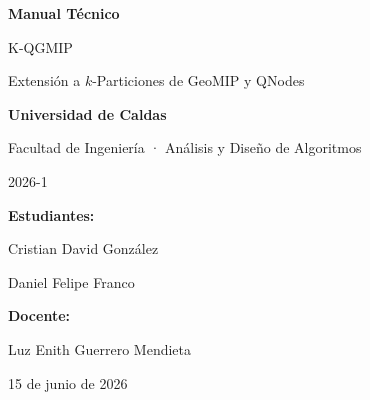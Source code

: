 \documentclass[12pt,letterpaper]{article}
\begin{document}
\begin{titlepage}
  \centering
  \vspace*{2cm}

  {\Huge\bfseries Manual Técnico \par}
  \vspace{0.6cm}
  {\LARGE K-QGMIP \par}
  \vspace{0.3cm}
  {\large Extensión a $k$-Particiones de GeoMIP y QNodes \par}

  \vspace{3cm}

  {\Large\bfseries Universidad de Caldas \par}
  \vspace{0.4cm}
  {\large Facultad de Ingeniería · Análisis y Diseño de Algoritmos \par}
  {\large 2026-1 \par}

  \vspace{4cm}

  {\large\textbf{Estudiantes:} \par}
  \vspace{0.3em}
  {\large Cristian David González \par}
  {\large Daniel Felipe Franco \par}
  \vspace{1.2em}
  {\large\textbf{Docente:} \par}
  \vspace{0.3em}
  {\large Luz Enith Guerrero Mendieta \par}

  \vfill

  {\large 15 de junio de 2026 \par}
\end{titlepage}

\tableofcontents
\clearpage
\listoffigures
\clearpage
\listofalgorithms
\newpage











\end{document}
